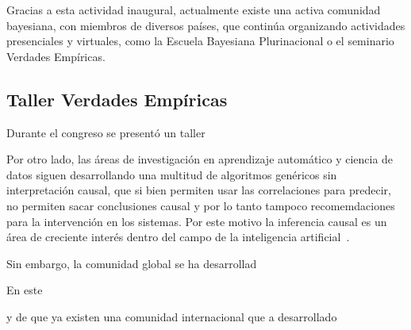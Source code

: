 \documentclass[a4paper,11pt]{book}
\theoremstyle{definition}
\begin{document}
%
%
%
%
%
%
%




Gracias a esta actividad inaugural, actualmente existe una activa comunidad bayesiana, con miembros de diversos países, que continúa organizando actividades presenciales y virtuales, como la Escuela Bayesiana Plurinacional o el seminario Verdades Empíricas.



\subsection{Taller Verdades Empíricas}

Durante el congreso se presentó un taller



Por otro lado, las áreas de investigación en aprendizaje automático y ciencia de datos siguen desarrollando una multitud de algoritmos genéricos sin interpretación causal, que si bien permiten usar las correlaciones para predecir, no permiten sacar conclusiones causal y por lo tanto tampoco recomemdaciones para la intervención en los sistemas.
%
Por este motivo la inferencia causal es un área de creciente interés dentro del campo de la inteligencia artificial~\cite{pearl2009-causality, peters2017-causalInference}.










Sin embargo, la comunidad global se ha desarrollad

En este





y de que ya existen una comunidad internacional que a desarrollado
\end{document}
